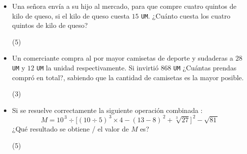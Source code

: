 \documentclass[12pt, twocolumn, landscape, a4paper]{article}
\begin{document}
\begin{itemize}
{¿Cuál es el tiempo promedio (en minutos) que se dispone para hacerlo?
\begin{tasks}(3)
\end{tasks}
}
\item{Una señora envía a su hijo al mercado, para que compre cuatro quintos de kilo de queso, si el kilo de queso cuesta $15$ {\tt {\scriptsize UM}}. ¿Cuánto cuesta los cuatro quintos de kilo de queso?
\begin{tasks}(5)
\end{tasks}
}
\item{Un comerciante compra al por mayor camisetas de deporte y sudaderas a $28$ {\tt {\scriptsize UM}} y $12$ {\tt {\scriptsize UM}} la unidad respectivamente. Si invirtió $868$ {\tt {\scriptsize UM}} ¿Cuántas prendas compró en total?, sabiendo que la cantidad de camisetas es la mayor posible.
\begin{tasks}(3)
\end{tasks}
}
\item{Si se resuelve correctamente la siguiente operación combinada : $$M = 10^{\,3} \div \Big[(10 \div 5)^{\,3} \times 4 - (13 - 8)^{\,2} + \sqrt[3]{27}\Big]^{\,2} - \sqrt{81\,}$$ ¿Qué resultado se obtiene / el valor de $M$ es?
\begin{tasks}(5)
\end{tasks}
}
\end{itemize}
\end{document}
